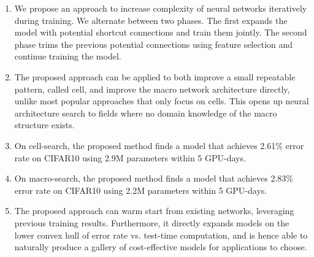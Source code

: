 \begin{enumerate}[resume]
\item We propose an approach to increase complexity of neural networks iteratively during training. We alternate between two phases. The first expands the model with potential shortcut connections and train them jointly. The second phase trims the previous potential connections using feature selection and continue training the model. 
\item The proposed approach can be applied to both improve a small repeatable pattern, called cell, and improve the macro network architecture directly, unlike most popular approaches that only focus on cells. This opens up neural architecture search to fields where no domain knowledge of the macro structure exists. 
\item On cell-search, the proposed method finds a model that achieves 2.61\% error rate on CIFAR10 using 2.9M parameters within 5 GPU-days. 
\item On macro-search, the proposed method finds a model that achieves 2.83\% error rate on CIFAR10 using 2.2M parameters within 5 GPU-days. 
\item The proposed approach can warm start from existing networks, leveraging previous training results. Furthermore, it directly expands models on the lower convex hull of error rate vs. test-time computation, and is hence able to naturally produce a gallery of cost-effective models for applications to choose. 
\end{enumerate}



